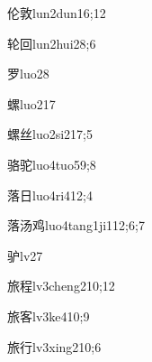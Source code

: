 \begin{verbete}{伦敦}{lun2dun1}{6;12}
\end{verbete}

\begin{verbete}{轮回}{lun2hui2}{8;6}
\end{verbete}

\begin{verbete}{罗}{luo2}{8}
\end{verbete}

\begin{verbete}{螺}{luo2}{17}
\end{verbete}

\begin{verbete}{螺丝}{luo2si2}{17;5}
\end{verbete}

\begin{verbete}{骆驼}{luo4tuo5}{9;8}
\end{verbete}

\begin{verbete}{落日}{luo4ri4}{12;4}
\end{verbete}

\begin{verbete}{落汤鸡}{luo4tang1ji1}{12;6;7}
\end{verbete}

\begin{verbete}{驴}{lv2}{7}
\end{verbete}

\begin{verbete}{旅程}{lv3cheng2}{10;12}
\end{verbete}

\begin{verbete}{旅客}{lv3ke4}{10;9}
\end{verbete}

\begin{verbete}{旅行}{lv3xing2}{10;6}
\end{verbete}


